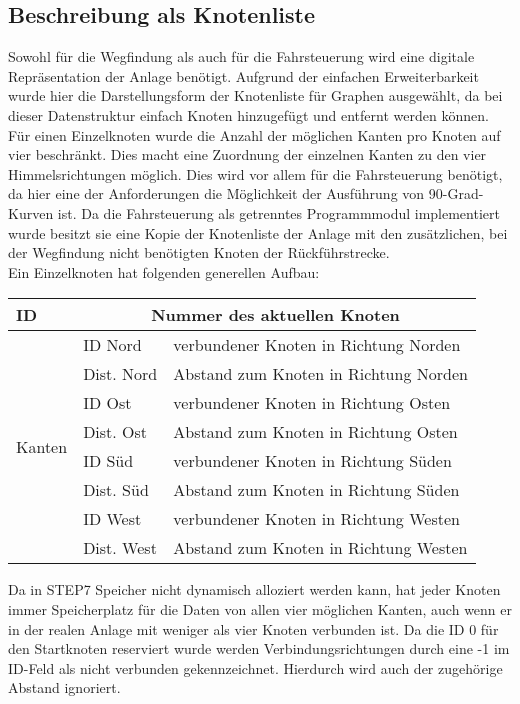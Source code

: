 		\subsection{Beschreibung als Knotenliste}
			\label{Knotenliste}
			Sowohl für die Wegfindung als auch für die Fahrsteuerung wird eine digitale Repräsentation der Anlage benötigt. Aufgrund der einfachen Erweiterbarkeit wurde hier die Darstellungsform der Knotenliste für Graphen ausgewählt, da bei dieser Datenstruktur einfach Knoten hinzugefügt und entfernt werden können. Für einen Einzelknoten wurde die Anzahl der möglichen Kanten pro Knoten auf vier beschränkt. Dies macht eine Zuordnung der einzelnen Kanten zu den vier Himmelsrichtungen möglich. Dies wird vor allem für die Fahrsteuerung benötigt, da hier eine der Anforderungen die Möglichkeit der Ausführung von 90-Grad-Kurven ist. Da die Fahrsteuerung als getrenntes Programmmodul implementiert wurde besitzt sie eine Kopie der Knotenliste der Anlage mit den zusätzlichen, bei der Wegfindung nicht benötigten Knoten der Rückführstrecke.\\
			
			Ein Einzelknoten hat folgenden generellen Aufbau:\\
			
			\begin{longtable}{| l | l | l |}
				
				\hline
				\textbf{ID} &
				\multicolumn{2}{c|}{Nummer des aktuellen Knoten} \\
				\hline
				\multirow{8}{*}{Kanten}
					& ID Nord & verbundener Knoten in Richtung Norden \\ \cline{2-3}
					& Dist. Nord & Abstand zum Knoten in Richtung Norden\\ \cline{2-3}
					& ID Ost & verbundener Knoten in Richtung Osten \\ \cline{2-3}
					& Dist. Ost & Abstand zum Knoten in Richtung Osten\\ \cline{2-3}
					& ID Süd & verbundener Knoten in Richtung Süden\\ \cline{2-3}
					& Dist. Süd & Abstand zum Knoten in Richtung Süden\\ \cline{2-3}
					& ID West & verbundener Knoten in Richtung Westen\\ \cline{2-3}
					& Dist. West & Abstand zum Knoten in Richtung Westen\\ 
					\hline
	
			\end{longtable}
			
			Da in \ac{STEP7} Speicher nicht dynamisch alloziert werden kann, hat jeder Knoten immer Speicherplatz für die Daten von allen vier möglichen Kanten, auch wenn er in der realen Anlage mit weniger als vier Knoten verbunden ist. Da die ID 0 für den Startknoten reserviert wurde werden Verbindungsrichtungen durch eine -1 im ID-Feld als nicht verbunden gekennzeichnet. Hierdurch wird auch der zugehörige Abstand ignoriert.\\
			
